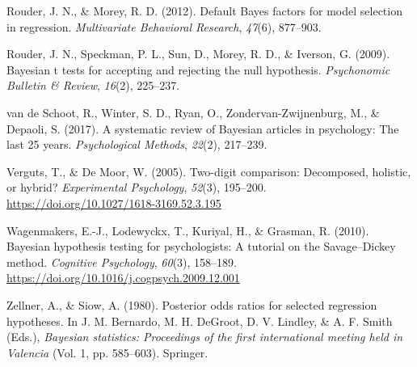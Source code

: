 \documentclass[english,,doc,floatsintext]{apa6}
\begin{document}
\leavevmode\hypertarget{ref-rouder2012defaultRegression}{}%
Rouder, J. N., \& Morey, R. D. (2012). Default Bayes factors for model selection in regression. \emph{Multivariate Behavioral Research}, \emph{47}(6), 877--903.

\leavevmode\hypertarget{ref-rouder2009bayesian}{}%
Rouder, J. N., Speckman, P. L., Sun, D., Morey, R. D., \& Iverson, G. (2009). Bayesian t tests for accepting and rejecting the null hypothesis. \emph{Psychonomic Bulletin \& Review}, \emph{16}(2), 225--237.

\leavevmode\hypertarget{ref-vandeschoot2017systematic}{}%
van de Schoot, R., Winter, S. D., Ryan, O., Zondervan-Zwijnenburg, M., \& Depaoli, S. (2017). A systematic review of Bayesian articles in psychology: The last 25 years. \emph{Psychological Methods}, \emph{22}(2), 217--239.

\leavevmode\hypertarget{ref-vergutsDeMoor2005}{}%
Verguts, T., \& De Moor, W. (2005). Two-digit comparison: Decomposed, holistic, or hybrid? \emph{Experimental Psychology}, \emph{52}(3), 195--200. \url{https://doi.org/10.1027/1618-3169.52.3.195}

\leavevmode\hypertarget{ref-wagenmakers2010}{}%
Wagenmakers, E.-J., Lodewyckx, T., Kuriyal, H., \& Grasman, R. (2010). Bayesian hypothesis testing for psychologists: A tutorial on the Savage--Dickey method. \emph{Cognitive Psychology}, \emph{60}(3), 158--189. \url{https://doi.org/10.1016/j.cogpsych.2009.12.001}

\leavevmode\hypertarget{ref-zellner1980posterior}{}%
Zellner, A., \& Siow, A. (1980). Posterior odds ratios for selected regression hypotheses. In J. M. Bernardo, M. H. DeGroot, D. V. Lindley, \& A. F. Smith (Eds.), \emph{Bayesian statistics: Proceedings of the first international meeting held in Valencia} (Vol. 1, pp. 585--603). Springer.
\end{document}

